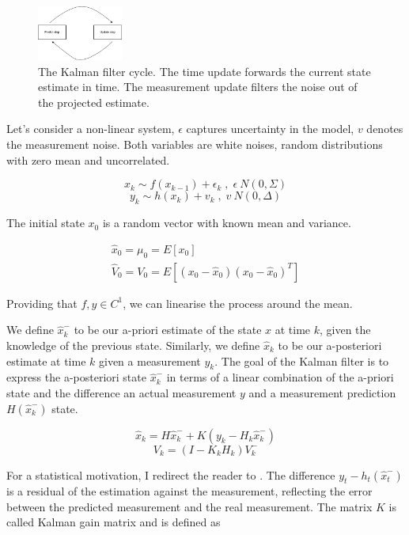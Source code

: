 \documentclass[mscthesis]{usiinfthesis}
\begin{document}
\begin{figure}[h]
    \centering
    \includegraphics[width=0.25\textwidth]{kalman_diagram.png}
    \caption{The Kalman filter cycle. The time update forwards the current state estimate in time. The measurement update filters the noise out of the projected estimate.}
    \label{fig:kalman_cycle}
\end{figure}

Let's consider a non-linear system, $\epsilon$ captures uncertainty in the model, $v$ denotes the measurement noise. Both variables are white noises, random distributions with zero mean and uncorrelated. 

\[
x_k \sim f(x_{k-1}) + \epsilon_k \; , \; \epsilon ~ N(0, \Sigma)
\]
\[
y_k \sim h(x_{k}) + v_{k} \; , \; v ~ N(0, \Delta)
\]

The initial state $x_0$ is a random vector with known mean and variance.

\begin{eqfloat}
\begin{equation}
\begin{array}{l}
\hat{x}_0 = \mu_0 = E[x_0] \\
\hat{V}_0 = V_0 = E[(x_0-\hat{x}_0)(x_0-\hat{x}_0)^T] 
\end{array}
\label{eq:kalman_init}
\end{equation}
\caption{Initialization}
\end{eqfloat}

Providing that $f, y \in C^1$, we can linearise the process around the mean. 

We define $\hat{x}_k^-$ to be our a-priori estimate of the state $x$ at time $k$, given the knowledge of the previous state. Similarly, we define $\hat{x}_k$ to be our a-posteriori estimate at time $k$ given a measurement $y_k$. The goal of the Kalman filter is to express the a-posteriori state $\hat{x}_k^-$ in terms of a linear combination of the a-priori state and the difference an actual measurement $y$ and a measurement prediction $H(\hat{x}_k^-)$ state. 

\[
\hat{x}_k = H\hat{x}_k^- + K (y_k - H_k \hat{x}_k^-)
\]
\[
V_k = (I-K_k H_k)V_k^-
\]


For a statistical motivation, I redirect the reader to \citet{paper:Maybeck79}. The difference $y_t - h_t(\hat{x}_t^-)$ is a residual of the estimation against the measurement, reflecting the error between the predicted measurement and the real measurement. The matrix $K$ is called Kalman gain matrix and is defined as 
\end{document}
